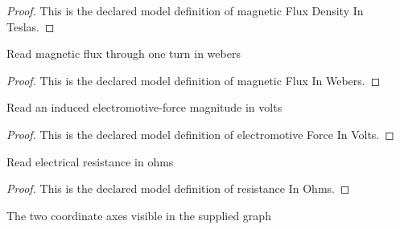 \begin{proof}
  This is the declared model definition of magnetic Flux Density In Teslas.
\end{proof}
\begin{definition}
  \label{def:physics:phyx-mini-0980:phyxminiproblems-problemphyxmini0980-magneticfluxinwebers}
  Read magnetic flux through one turn in webers
\end{definition}
\begin{proof}
  This is the declared model definition of magnetic Flux In Webers.
\end{proof}
\begin{definition}
  \label{def:physics:phyx-mini-0980:phyxminiproblems-problemphyxmini0980-electromotiveforceinvolts}
  Read an induced electromotive-force magnitude in volts
\end{definition}
\begin{proof}
  This is the declared model definition of electromotive Force In Volts.
\end{proof}
\begin{definition}
  \label{def:physics:phyx-mini-0980:phyxminiproblems-problemphyxmini0980-resistanceinohms}
  Read electrical resistance in ohms
\end{definition}
\begin{proof}
  This is the declared model definition of resistance In Ohms.
\end{proof}
\begin{definition}
  \label{def:physics:phyx-mini-0980:phyxminiproblems-problemphyxmini0980-plotaxis}
  The two coordinate axes visible in the supplied graph
\end{definition}
